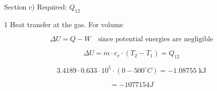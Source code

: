Section c) Required: \( Q_{12} \)

1 Heat transfer at the gas. For volume

\[
\Delta U = Q - W \quad \text{since potential energies are negligible}
\]

\[
\Delta U = \dot{m} \cdot c_v \cdot (T_2 - T_1) = Q_{12}
\]

\[
3.4189 \cdot 0.633 \cdot 10^5 \cdot (0 - 500^\circ C) = -1.08755 \text{ kJ}
\]

\[
= -1077154 J
\]